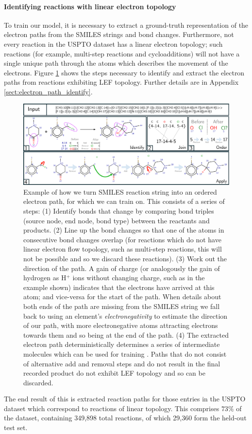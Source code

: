 \paragraph{Identifying reactions with linear electron topology}

To train our model, it is necessary to extract a ground-truth representation of the electron paths from the SMILES strings and bond changes.
Furthermore, not every reaction in the USPTO dataset has a linear electron topology; 
such reactions (for example, multi-step reactions and cycloadditions) will not have a single unique path through the atoms 
which describes the movement of the electrons. 
Figure \ref{fig:dataset_steps} shows the steps necessary to identify and extract the electron paths from reactions exhibiting LEF topology. Further details are in Appendix \ref{sect:electron_path_identify}.


\begin{figure}
\centering
\includegraphics[width=1.\textwidth]{imgs/dataset_steps}
\caption{
Example of how we turn SMILES reaction string into an ordered electron path, for which we can train \ourModel on. 
This consists of a series of steps: 
(1) Identify bonds that change by comparing bond triples (source node, end node, bond type) between the reactants and products. 
(2) Line up the bond changes so that one of the atoms in consecutive bond changes overlap (for reactions which do not have linear electron flow topology, such as multi-step reactions, this will not be possible and so we discard these reactions).
(3) Work out the direction of the path. A gain of charge (or analogously the gain of hydrogen as H$^+$ ions without changing charge, such as in the example shown) indicates that the electrons have arrived at this atom; and vice-versa for the start of the path.
When details about both ends of the path are missing from the SMILES string we fall back to using an element's {\em electronegativity} to estimate the direction of our path, with more electronegative atoms attracting electrons towards them and so being at the end of the path. 
(4) The extracted electron path deterministically determines a series of intermediate molecules which can be used for training \ourModel. 
Paths that do not consist of alternative add and removal steps and do not result in the final recorded product do not exhibit LEF topology and so can be discarded.
}
\label{fig:dataset_steps}
\end{figure}

The end result of this is extracted reaction paths for those entries in the USPTO dataset which 
correspond to reactions of linear topology.
This comprises $73\%$ of the dataset, containing 349,898 total reactions, of which 29,360 form the held-out test set.






